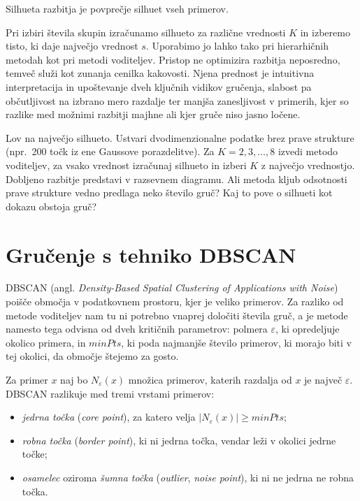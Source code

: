 Silhueta razbitja je povprečje silhuet vseh primerov.

Pri izbiri števila skupin izračunamo silhueto za različne vrednosti $K$ in izberemo tisto, ki daje največjo vrednost $s$. Uporabimo jo lahko tako pri hierarhičnih metodah kot pri metodi voditeljev. Pristop ne optimizira razbitja neposredno, temveč služi kot zunanja cenilka kakovosti. Njena prednost je intuitivna interpretacija in upoštevanje dveh ključnih vidikov gručenja, slabost pa občutljivost na izbrano mero razdalje ter manjša zanesljivost v primerih, kjer so razlike med možnimi razbitji majhne ali kjer gruče niso jasno ločene.

\begin{exercise}{Lov na največjo silhueto.}
Ustvari dvodimenzionalne podatke brez prave strukture (npr.\ 200 točk iz ene Gaussove porazdelitve). Za $K=2,3,\ldots,8$ izvedi metodo voditeljev, za vsako vrednost izračunaj silhueto in izberi $K$ z največjo vrednostjo. Dobljeno razbitje predstavi v razsevnem diagramu. Ali metoda kljub odsotnosti prave strukture vedno predlaga neko število gruč? Kaj to pove o silhueti kot dokazu obstoja gruč?
\end{exercise}

\section{Gručenje s tehniko DBSCAN}

DBSCAN (angl. {\em Density-Based Spatial Clustering of Applications with Noise}) 
%
%
poišče območja v podatkovnem prostoru, kjer je veliko primerov. Za razliko od metode voditeljev nam tu ni potrebno vnaprej določiti števila gruč, a je metode namesto tega odvisna od dveh kritičnih parametrov: polmera $\varepsilon$, ki opredeljuje okolico primera, in $minPts$, ki poda najmanjše število primerov, ki morajo biti v tej okolici, da območje štejemo za gosto.

Za primer $x$ naj bo $N_\varepsilon(x)$ množica primerov, katerih razdalja od $x$ je največ $\varepsilon$. DBSCAN razlikuje med tremi vrstami primerov:
\begin{itemize}
\item {\em jedrna točka} ({\em core point}), za katero velja $|N_\varepsilon(x)| \ge minPts$;
\item {\em robna točka} ({\em border point}), ki ni jedrna točka, vendar leži v okolici jedrne točke;
\item {\em osamelec} oziroma {\em šumna točka} ({\em outlier}, {\em noise point}), ki ni ne jedrna ne robna točka.
\end{itemize}

